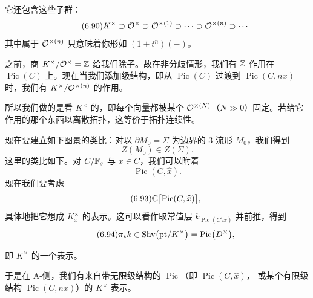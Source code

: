 它还包含这些子群：
\begin{equation}\tag{6.90}\label{eq:6.90}
K^{\times}\supset\mathcal{O}^{\times}\supset\mathcal{O}^{\times(1)}\supset\cdots\supset\mathcal{O}^{\times(n)}\supset\cdots
\end{equation}
其中属于 $\mathcal{O}^{\times(n)}$ 只意味着你形如 $(1+t^n)(-)$。

之前，商 $K^{\times}/\mathcal{O}^{\times}=\mathbb{Z}$ 给我们除子。故在非分歧情形，我们有 $\mathbb{Z}$ 作用在
$\operatorname{Pic}(C)$ 上。现在当我们添加级结构，即从 $\operatorname{Pic}(C)$ 过渡到
$\operatorname{Pic}(C,nx)$ 时，我们有 $K^{\times}/\mathcal{O}^{\times(n)}$ 的作用。

所以我们做的是看 $K^{\times}$ 的，即每个向量都被某个
$\mathcal{O}^{\times(N)}$（$N\gg 0$）固定。若给它作用的那个东西以离散拓扑，这等价于拓扑连续性。

现在要建立如下图景的类比：对以 $\partial M_0=\Sigma$ 为边界的 3-流形 $M_0$，我们得到
\begin{equation}\tag{6.91}\label{eq:6.91}
Z(M_0)\in Z(\Sigma).
\end{equation}
这里的类比如下。对 $C/\mathbb{F}_q$ 与 $x\in C$，我们可以附着
\begin{equation}\tag{6.92}\label{eq:6.92}
\operatorname{Pic}(C,\widehat{x}).
\end{equation}
现在我们要考虑
\begin{equation}\tag{6.93}\label{eq:6.93}
\mathbb{C}\bigl[\operatorname{Pic}(C,\widehat{x})\bigr],
\end{equation}
具体地把它想成 $K_x^{\times}$ 的表示。这可以看作取常值层 $k_{\operatorname{Pic}(C\setminus x)}$
并前推，得到
\begin{equation}\tag{6.94}\label{eq:6.94}
\pi_*k\in\mathrm{Shv}\bigl(\mathrm{pt}/K^{\times}\bigr)=\operatorname{Pic}\bigl(D^{\times}\bigr),
\end{equation}


即 $K^{\times}$ 的一个表示。

于是在 A-侧，我们有来自带无限级结构的 $\operatorname{Pic}$（即 $\operatorname{Pic}(C,\widehat{x})$，
或某个有限级结构 $\operatorname{Pic}(C,nx)$）的 $K^{\times}$ 表示。

